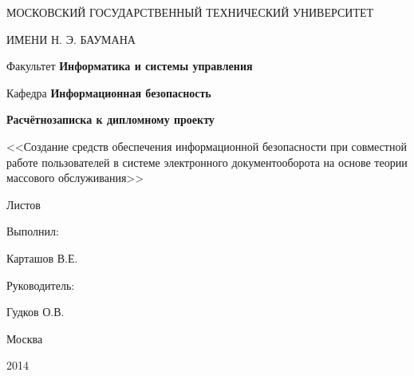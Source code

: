 \thispagestyle{empty}

\begin{center}
МОСКОВСКИЙ ГОСУДАРСТВЕННЫЙ ТЕХНИЧЕСКИЙ УНИВЕРСИТЕТ\par
ИМЕНИ Н. Э. БАУМАНА\par 
\par
Факультет \textbf{Информатика и системы управления}\par Кафедра \textbf{Информационная безопасность}
\end{center}

\vspace{20mm}


\vspace{30mm}

\vspace{5mm}
\begin{center}
{\bf \large Расчётно записка к дипломному проекту
\par}



\vspace{10mm}
<<Создание средств обеспечения информационной безопасности при совместной работе пользователей в системе электронного документооборота на основе теории массового обслуживания>>

\vspace{10mm}
{%
Листов \pageref*{LastPage}
}
\end{center}

\vspace{20mm}
\begin{flushright}
Выполнил:

Карташов В.Е.

\end{flushright}

\vspace{10mm}
\begin{flushright}
Руководитель:

Гудков О.В.

\end{flushright}

\vspace{40mm}
\begin{center}
{Москва

2014}
\end{center}

\newpage